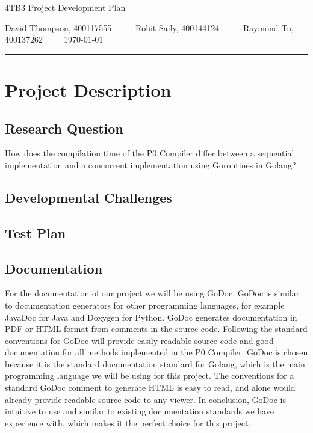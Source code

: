 \documentclass{article}
\author{Rohit Saily, David Thompson, Raymond Tu}
\date{\today}
\title{\mytitle}
\newcommand{\mytitle}{4TB3 Project Development Plan}
\begin{document}
{\sffamily
{\huge \mytitle}

\medskip

David Thompson, 400117555~~~~~
Rohit Saily, 400144124~~~~~
Raymond Tu, 400137262~~~~~\today
}

\par\noindent\rule{\textwidth}{0.4pt}
\bigskip

\section{Project Description}

\subsection{Research Question}

How does the compilation time of the P0 Compiler differ between a sequential implementation and a concurrent implementation using Goroutines in Golang?  

\subsection{Developmental Challenges} %

\subsection{Test Plan} %

\subsection{Documentation} %

For the documentation of our project we will be using GoDoc. GoDoc is similar to documentation 
generators for other programming languages, for example JavaDoc for Java and Doxygen for Python. 
GoDoc generates documentation in PDF or HTML format from comments in the source code. 
Following the standard conventions for GoDoc will provide easily readable source code and good 
documentation for all methods implemented in the P0 Compiler. GoDoc is chosen because it is the standard documentation standard for Golang, 
which is the main programming language we will be using for this project. The conventions for a standard GoDoc comment to generate HTML
 is easy to read, and alone would already provide readable source code to any viewer. 
 In conclusion, GoDoc is intuitive to use and similar to existing documentation standards we have experience with, 
 which makes it the perfect choice for this project.
\end{document}
